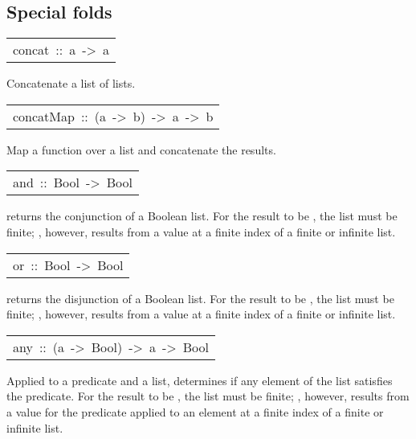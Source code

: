 \subsection{Special folds
}
\begin{haddockdesc}
\item[\begin{tabular}{@{}l}
concat\ ::\ {\char 91}{\char 91}a{\char 93}{\char 93}\ ->\ {\char 91}a{\char 93}
\end{tabular}]\haddockbegindoc
Concatenate a list of lists.
\par

\end{haddockdesc}
\begin{haddockdesc}
\item[\begin{tabular}{@{}l}
concatMap\ ::\ (a\ ->\ {\char 91}b{\char 93})\ ->\ {\char 91}a{\char 93}\ ->\ {\char 91}b{\char 93}
\end{tabular}]\haddockbegindoc
Map a function over a list and concatenate the results.
\par

\end{haddockdesc}
\begin{haddockdesc}
\item[\begin{tabular}{@{}l}
and\ ::\ {\char 91}Bool{\char 93}\ ->\ Bool
\end{tabular}]\haddockbegindoc
{} returns the conjunction of a Boolean list.  For the result to be
 , the list must be finite; , however, results from a 
 value at a finite index of a finite or infinite list.
\par

\end{haddockdesc}
\begin{haddockdesc}
\item[\begin{tabular}{@{}l}
or\ ::\ {\char 91}Bool{\char 93}\ ->\ Bool
\end{tabular}]\haddockbegindoc
{} returns the disjunction of a Boolean list.  For the result to be
 , the list must be finite; , however, results from a 
 value at a finite index of a finite or infinite list.
\par

\end{haddockdesc}
\begin{haddockdesc}
\item[\begin{tabular}{@{}l}
any\ ::\ (a\ ->\ Bool)\ ->\ {\char 91}a{\char 93}\ ->\ Bool
\end{tabular}]\haddockbegindoc
Applied to a predicate and a list,  determines if any element
 of the list satisfies the predicate.  For the result to be
 , the list must be finite; , however, results from a 
 value for the predicate applied to an element at a finite index of a finite or infinite list.
\par

\end{haddockdesc}
